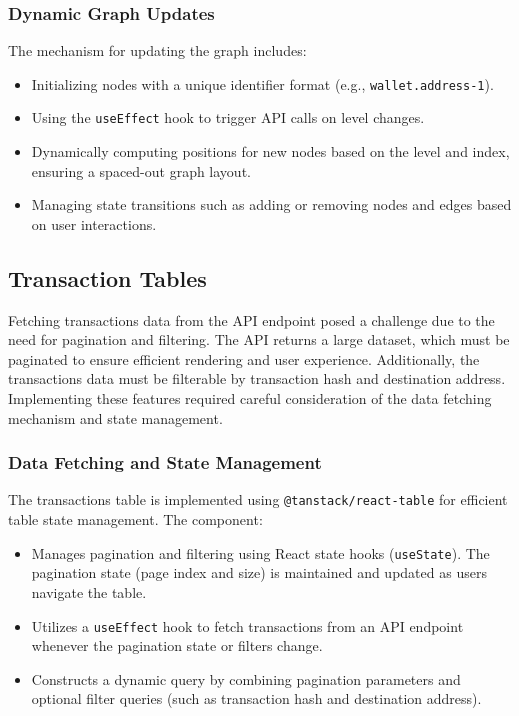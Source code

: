 \subsubsection{Dynamic Graph Updates}
The mechanism for updating the graph includes:
\begin{itemize}
    \item Initializing nodes with a unique identifier format (e.g., \texttt{wallet.address-1}).
    \item Using the \texttt{useEffect} hook to trigger API calls on level changes.
    \item Dynamically computing positions for new nodes based on the level and index, ensuring a spaced-out graph layout.
    \item Managing state transitions such as adding or removing nodes and edges based on user interactions.
\end{itemize}

\subsection{Transaction Tables}
Fetching transactions data from the API endpoint posed a challenge due to the need for pagination and filtering. The API returns a large dataset, which must be paginated to ensure efficient rendering and user experience. Additionally, the transactions data must be filterable by transaction hash and destination address. Implementing these features required careful consideration of the data fetching mechanism and state management.

\subsubsection{Data Fetching and State Management}
The transactions table is implemented using \texttt{@tanstack/react-table} for efficient table state management. The component:
\begin{itemize}
    \item Manages pagination and filtering using React state hooks (\texttt{useState}). The pagination state (page index and size) is maintained and updated as users navigate the table.
    \item Utilizes a \texttt{useEffect} hook to fetch transactions from an API endpoint whenever the pagination state or filters change.
    \item Constructs a dynamic query by combining pagination parameters and optional filter queries (such as transaction hash and destination address).
\end{itemize}

